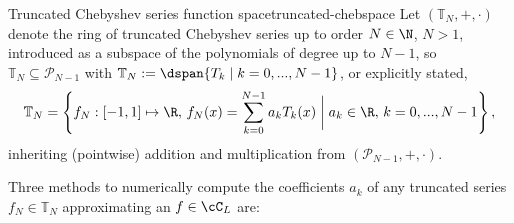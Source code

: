 \documentclass[12pt, a4paper]{article}
\begin{document}
  \begin{definition}{Truncated Chebyshev series function space}{truncated-chebspace}
    Let $(\mathbb{T}_N, +, \cdot)$ denote the ring of truncated Chebyshev series up to order $N \in \N$, $N > 1$, introduced as a subspace of the polynomials of degree up to $N-1$, so $\mathbb{T}_N \subseteq \mathcal{P}_{N-1}$ with $\mathbb{T}_N := \dspan\{T_k \;|\; k = 0, ..., N-1\}$, or explicitly stated,
    $$\mathbb{T}_N = \left\{f_N: [-1, 1] \mapsto \R,\, f_N(x) = \sum_{k=0}^{N-1} a_k T_k(x) \;\bigg|\; a_k \in \R,\, k = 0, ..., N-1\right\},$$
    inheriting (pointwise) addition and multiplication from $(\mathcal{P}_{N-1}, +, \cdot)$.
  \end{definition}

  Three methods to numerically compute the coefficients $a_k$ of any truncated series $f_N \in \mathbb{T}_N$ approximating an $f \in \cC_L$ are:
\end{document}

